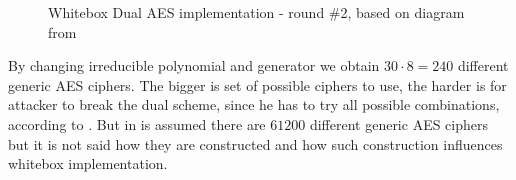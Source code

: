 \documentclass[11pt,oneside,final]{fithesis2}
\begin{document}
	\begin{figure}
	\begin{center}
	\leavevmode
	\centerline{}
	\end{center}
	\caption{Whitebox Dual AES implementation - round \#2, based on diagram from \citep{Muir_atutorial}}
	\label{fig:wbaesdual}
	\end{figure}
	
	By changing irreducible polynomial and generator we obtain $30 \cdot 8 = 240$ different generic AES ciphers. The bigger is set of possible ciphers to use, the harder is
	for attacker to break the dual scheme, since he has to try all possible combinations, according to \citep{Karroumi:2010:PWA:2041036.2041060}. But in 
	\citep{Karroumi:2010:PWA:2041036.2041060} is assumed there are $61200$ different generic AES ciphers but it is not said how they are constructed and how 
	such construction influences whitebox implementation.
	
\end{document}
